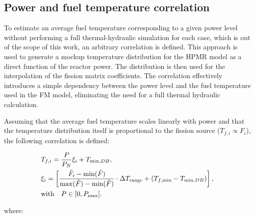 \documentclass[preprint,review,12pt]{elsarticle}
\begin{document}


\subsection{Power and fuel temperature correlation}
\label{subsec:Power and fuel temperature correlation}
To estimate an average fuel temperature corresponding to a given power level without performing a full thermal-hydraulic simulation for each case, which is out of the scope of this work, an arbitrary correlation is defined. This approach is used to generate a mockup temperature distribution for the HPMR model as a direct function of the reactor power. The distribution is then used for the interpolation of the fission matrix coefficients. The correlation effectively introduces a simple dependency between the power level and the fuel temperature used in the FM model, eliminating the need for a full thermal hydraulic calculation.

Assuming that the average fuel temperature scales linearly with power and that the temperature distribution itself is proportional to the fission source ($T_{f,i} \propto F_{i} $), the following correlation is defined:


\begin{align}
 &T_{f,i} =  \frac{P}{P_N} \xi_i  + T_{\min,DB}, 
 \\ &
\xi_i= \left[ \frac{\tilde{F}_i - \min(\tilde{F})}{\max(\tilde{F}) - \min(\tilde{F})} \cdot \Delta T_{\text{range}} + (T_{f,\min} - T_{\min,DB}) \right], 
\notag \\ &
 \text{with} \quad P \in [0,P_{\text{max}}].
\label{eq:correction_power_temperature}
\end{align}



where: 
\end{document}
